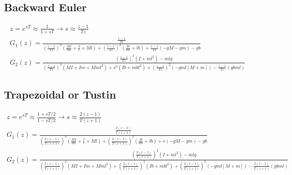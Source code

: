 	\subsection{Backward Euler}
		
		\begin{eqnarray}
			z = e^{sT} \approx \frac{1}{1 + sT} \rightarrow s \approx \frac{z - 1}{Tz}\\			
			G_1\left(z\right)=\frac{\frac{z - 1}{Tz}}{\left( \frac{z - 1}{Tz}\right) ^3\left(\frac{MI}{ml}+\frac{I}{l}+Ml\right)+\left( \frac{z - 1}{Tz}\right) ^2\left(\frac{Ib}{ml}+lb\right)+\frac{z - 1}{Tz}(-gM-gm)-gb}
			\\
			G_2\left(z\right)=\frac{\left( \frac{z - 1}{Tz}\right) ^2\left(I+ml^2\right)-mlg}{\left( \frac{z - 1}{Tz}\right) ^4\left(MI+Im+Mml^2\right)+s^3\left(Ib+m{bl}^2\right)+\left( \frac{z - 1}{Tz}\right) ^2\left(-gml\left[M+m\right]\right)-\frac{z - 1}{Tz}\left(gbml\right)}
		\end{eqnarray}
	
	\subsection{Trapezoidal or Tustin}
		\begin{small}
		\begin{eqnarray}
			z = e^{sT} \approx \frac{1 + sT/2}{1 - sT/2} \rightarrow s \approx \frac{2\left( z - 1\right) }{T\left( z+1\right) }\\		
			G_1\left(z\right)=\frac{\frac{2\left( z - 1\right) }{T\left( z+1\right) }}{\left( \frac{2\left( z - 1\right) }{T\left( z+1\right) }\right) ^3\left(\frac{MI}{ml}+\frac{I}{l}+Ml\right)+\left( \frac{2\left( z - 1\right) }{T\left( z+1\right) }\right) ^2\left(\frac{Ib}{ml}+lb\right)+s(-gM-gm)-gb}
			\\
			G_2\left(z\right)=\frac{\left( \frac{2\left( z - 1\right) }{T\left( z+1\right) }\right) ^2\left(I+ml^2\right)-mlg}{\left( \frac{2\left( z - 1\right) }{T\left( z+1\right) }\right) ^4\left(MI+Im+Mml^2\right)+\left( \frac{2\left( z - 1\right) }{T\left( z+1\right) }\right) ^3\left(Ib+m{bl}^2\right)+\left( \frac{2\left( z - 1\right) }{T\left( z+1\right) }\right) ^2\left(-gml\left[M+m\right]\right)-\frac{2\left( z - 1\right) }{T\left( z+1\right) }\left(gbml\right)}
		\end{eqnarray}
		\end{small}
		
